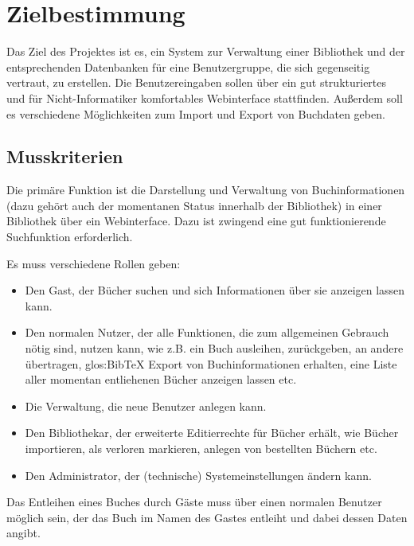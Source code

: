 
\chapter{Zielbestimmung}
Das Ziel des Projektes ist es, ein System zur Verwaltung einer Bibliothek und der entsprechenden Datenbanken für eine Benutzergruppe, die sich gegenseitig vertraut, zu erstellen. Die Benutzereingaben sollen über ein gut strukturiertes und für Nicht-Informatiker komfortables Webinterface stattfinden. Außerdem soll es verschiedene Möglichkeiten zum Import und Export von Buchdaten geben. 

\section{Musskriterien}
Die primäre Funktion ist die Darstellung und Verwaltung von Buchinformationen (dazu gehört auch der momentanen Status innerhalb der Bibliothek) in einer Bibliothek über ein Webinterface. Dazu ist zwingend eine gut funktionierende Suchfunktion erforderlich.

Es muss verschiedene Rollen geben:
\begin{itemize}
  \item Den Gast, der Bücher suchen und sich Informationen über sie anzeigen lassen kann.
  \item Den normalen Nutzer, der alle Funktionen, die zum allgemeinen Gebrauch nötig sind, nutzen kann, wie z.B. ein Buch ausleihen, zurückgeben, an andere übertragen, \gls{glos:BibTeX} Export von Buchinformationen erhalten, eine Liste aller momentan entliehenen Bücher anzeigen lassen etc.
  \item Die Verwaltung, die neue Benutzer anlegen kann.
  \item Den Bibliothekar, der erweiterte Editierrechte für Bücher erhält, wie Bücher importieren, als verloren markieren, anlegen von bestellten Büchern etc.
\item Den Administrator, der (technische) Systemeinstellungen ändern kann.
\end{itemize}

Das Entleihen eines Buches durch Gäste muss über einen normalen Benutzer möglich sein, der das Buch im Namen des Gastes entleiht und dabei dessen Daten angibt. 

